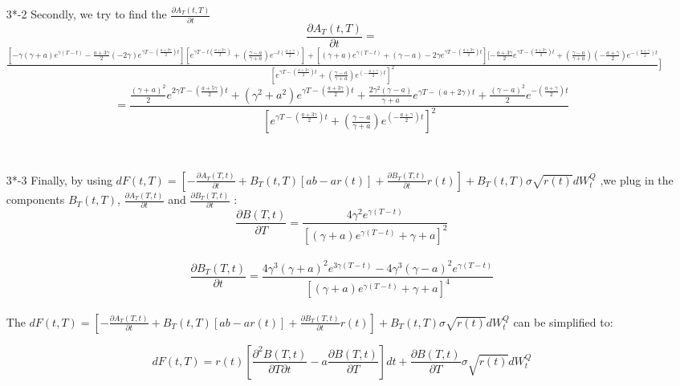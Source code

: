 \documentclass[14pt]{extarticle}
\begin{document}
\begin{itemize}
     \begin{itemize}
      \item [3*-2] Secondly, we try to find the $ \frac{ \partial A_T(t,T)}{ \partial t}  $
      $$\frac{ \partial A_T(t,T)}{ \partial t}= $$
      $\frac{ [-\gamma(\gamma+a)e^{\gamma(T-t)}-\frac{a+3\gamma}{2} (-2\gamma)e^{\gamma T-(\frac{a+3\gamma}{2})t}] [e^{\gamma T-t(\frac{a+3\gamma}{2})}+ (\frac{\gamma-a}{\gamma+a})e^{-t(\frac{a+\gamma}{2})} ]+[(\gamma+a)e^{\gamma(T-t)}+(\gamma-a)-2\gamma e^{\gamma T-(\frac{a+3\gamma}{2})t}  ]  [-\frac{a+3\gamma}{2}e^{\gamma T-(\frac{a+3\gamma}{2})t}+(\frac{\gamma-a}{\gamma+a}) (-\frac{a+\gamma}{2}) e^{-(\frac{a+\gamma}{2})t}   } 
      {[e^{\gamma T-(\frac{a+3\gamma}{2})t}+(\frac{\gamma-a}{\gamma+a})  e^{(-\frac{a+\gamma}{2})t}            ]^2}      ]      $
      ~\\
      $$ = \frac{ \frac{(\gamma+a)^2}{2}e^{2\gamma T-(\frac{a+5\gamma}{2} )t } +(\gamma^2+a^2)e^{\gamma T-(\frac{a+3\gamma}{2} )t}    +\frac{2\gamma^2(\gamma-a)}{\gamma+a}e^{\gamma T-(a+2\gamma)t}         +\frac{(\gamma-a)^2}{2}e^{-(\frac{a+\gamma}{2})t} } {[e^{\gamma T-(\frac{a+3\gamma}{2})t}+(\frac{\gamma-a}{\gamma+a})  e^{(-\frac{a+\gamma}{2})t}            ]^2 }                                $$
  \end{itemize}
  ~\\
  \begin{itemize}
      \item [3*-3]Finally, by using $ dF(t,T)=[-\frac{ \partial A_T (T,t) }{ \partial t}+B_T(t,T)[ab-ar(t)] + \frac{ \partial B_T (T,t) }{ \partial t} r(t)   ]+B_T(t,T)\sigma \sqrt{r(t)}dW_t^Q  $ ,we plug in the components $B_T(t,T) $, $\frac{ \partial A_T (T,t) }{ \partial t} $ and $\frac{ \partial B_T (T,t) }{ \partial t} $ :
      ~\\
      $$ \frac{ \partial B (T,t) }{ \partial T} =\frac{4\gamma^2 e^{\gamma(T-t)} } {[(\gamma+a) e^{\gamma(T-t)}+\gamma+a]^2} $$
      ~\\
       $$  \frac{ \partial B_T (T,t) }{ \partial t}= \frac{4\gamma^3(\gamma+a)^2e^{3\gamma(T-t)}-4\gamma^3(\gamma-a)^2e^{\gamma(T-t)}} {[(\gamma+a) e^{\gamma(T-t)}+\gamma+a]^4}$$
      ~\\
      The $ dF(t,T)=[-\frac{ \partial A_T (T,t) }{ \partial t}+B_T(t,T)[ab-ar(t)] + \frac{ \partial B_T (T,t) }{ \partial t} r(t)   ]+B_T(t,T)\sigma \sqrt{r(t)}dW_t^Q  $ can be simplified to:
     
       $$ dF(t,T)=r(t)[\frac{ \partial^2 B(T,t) }{ \partial T \partial t} -a \frac{ \partial B(T,t) }{ \partial T}]dt +\frac{ \partial B(T,t) }{ \partial T}\sigma\sqrt{r(t)}dW_t^Q  $$
  \end{itemize}
  
  
  
  
  
  
\end{itemize}
\end{document}
